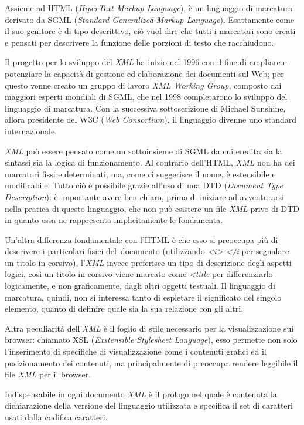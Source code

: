 Assieme ad HTML (\emph{HiperText Markup Language}), è un linguaggio di
marcatura derivato da SGML (\emph{Standard Generalized Markup
Language}). Esattamente come il suo genitore è di tipo descrittivo, ciò
vuol dire che tutti i marcatori sono creati e pensati per descrivere la
funzione delle porzioni di testo che racchiudono.

Il progetto per lo sviluppo del \emph{XML} ha inizio nel 1996 con il
fine di ampliare e potenziare la capacità di gestione ed elaborazione
dei documenti sul Web; per questo venne creato un gruppo di lavoro
\emph{XML Working Group}, composto dai maggiori esperti mondiali di
SGML, che nel 1998 completarono lo sviluppo del linguaggio di marcatura.
Con la successiva sottoscrizione di Michael Sunshine, allora presidente
del W3C (\emph{Web Consortium}), il linguaggio divenne uno standard
internazionale.

\emph{XML} può essere pensato come un sottoinsieme di SGML da cui
eredita sia la sintassi sia la logica di funzionamento. Al contrario
dell'HTML, \emph{XML} non ha dei marcatori fissi e determinati, ma, come
ci suggerisce il nome, è estensibile e modificabile. Tutto ciò è
possibile grazie all'uso di una DTD (\emph{Document Type Description}):
è importante avere ben chiaro, prima di iniziare ad avventurarsi nella
pratica di questo linguaggio, che non può esistere un file \emph{XML}
privo di DTD in quanto essa ne rappresenta implicitamente le fondamenta.

Un'altra differenza fondamentale con l'HTML è che esso si preoccupa più
di descrivere i particolari fisici del~documento (utilizzando
\emph{\textless{}i\textgreater{} \textless{}/i} per
segnalare un titolo in corsivo), l'\emph{XML} invece preferisce un tipo
di descrizione degli aspetti logici, così un titolo in corsivo viene
marcato come \emph{\textless{}title} per differenziarlo
logicamente, e non graficamente, dagli altri oggetti testuali. Il
linguaggio di marcatura, quindi, non si interessa tanto di espletare il
significato del singolo elemento, quanto di definire quale sia la sua
relazione con gli altri.

Altra peculiarità dell'\emph{XML} è il foglio di stile necessario per la
visualizzazione sui browser: chiamato XSL (\emph{Exstensible Stylesheet
Language}), esso permette non solo l'inserimento di specifiche di
visualizzazione come i contenuti grafici ed il posizionamento dei
contenuti, ma principalmente di preoccupa rendere leggibile il file
\emph{XML} per il browser.

Indispensabile in ogni documento \emph{XML} è il prologo nel quale è
contenuta la dichiarazione della versione del linguaggio utilizzata e
specifica il set di caratteri usati dalla codifica caratteri.

